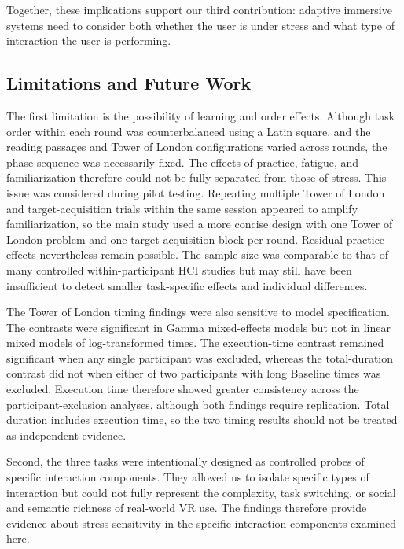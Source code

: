 Together, these implications support our third contribution: adaptive immersive systems need to consider both whether the user is under stress and what type of interaction the user is performing.


\subsection{Limitations and Future Work}
\label{sec:discussion-limitations}

The first limitation is the possibility of learning and order effects. Although task order within each round was counterbalanced using a Latin square, and the reading passages and Tower of London configurations varied across rounds, the phase sequence was necessarily fixed. The effects of practice, fatigue, and familiarization therefore could not be fully separated from those of stress. This issue was considered during pilot testing. Repeating multiple Tower of London and target-acquisition trials within the same session appeared to amplify familiarization, so the main study used a more concise design with one Tower of London problem and one target-acquisition block per round. Residual practice effects nevertheless remain possible. The sample size was comparable to that of many controlled within-participant HCI studies but may still have been insufficient to detect smaller task-specific effects and individual differences.

The Tower of London timing findings were also sensitive to model specification. The contrasts were significant in Gamma mixed-effects models but not in linear mixed models of log-transformed times. The execution-time contrast remained significant when any single participant was excluded, whereas the total-duration contrast did not when either of two participants with long Baseline times was excluded. Execution time therefore showed greater consistency across the participant-exclusion analyses, although both findings require replication. Total duration includes execution time, so the two timing results should not be treated as independent evidence.

Second, the three tasks were intentionally designed as controlled probes of specific interaction components. They allowed us to isolate specific types of interaction but could not fully represent the complexity, task switching, or social and semantic richness of real-world VR use. The findings therefore provide evidence about stress sensitivity in the specific interaction components examined here.

